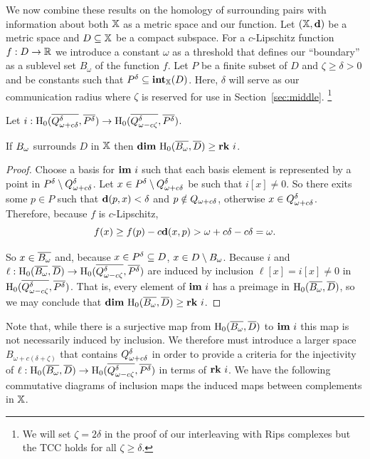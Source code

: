 We now combine these results on the homology of surrounding pairs with information about both $\mathbb{X}$ as a metric space and our function.
Let $(\mathbb{X},\mathbf{d})$ be a metric space and $D\subseteq \mathbb{X}$ be a compact subspace.
For a $c$-Lipschitz function $f : D\to \mathbb{R}$ we introduce a constant $\omega$ as a threshold that defines our ``boundary'' as a sublevel set $B_\omega$ of the function $f$.
Let $P$ be a finite subset of $D$ and $\zeta\geq\delta > 0 $ and be constants such that $P^\delta\subseteq \mathbf{int}_{\mathbb{X}}(D)$.
Here, $\delta$ will serve as our communication radius where $\zeta$ is reserved for use in Section~\ref{sec:middle}.
  \footnote{We will set $\zeta = 2\delta$ in the proof of our interleaving with Rips complexes but the TCC holds for all $\zeta\geq\delta$.}

\begin{lemma}\label{lem:psurj}
  Let $i : \mathrm{H}_0(\overline{Q_{\omega + c{\delta}}^{\delta}}, \overline{P^{\delta}})\to \mathrm{H}_0(\overline{Q_{\omega - c\zeta}^{\delta}}, \overline{P^\delta})$.

  If $B_{\omega}$ surrounds $D$ in $\mathbb{X}$ then $\mathbf{dim}~\mathrm{H}_0(\overline{B_{\omega}}, \overline{D})\geq \mathbf{rk}~i$.
\end{lemma}
\begin{proof}
  Choose a basis for $\mathbf{im}~i$ such that each basis element is represented by a point in $P^{\delta}\setminus Q_{\omega + c{\delta}}^{\delta}$.
  Let $x\in P^{\delta}\setminus Q_{\omega + c{\delta}}^{\delta}$ be such that $i[x] \neq 0$.
  So there exits some $p\in P$ such that $\mathbf{d}(p, x) < \delta$ and $p\notin Q_{\omega + c{\delta}}$, otherwise $x\in Q_{\omega + c{\delta}}^{\delta}$.
  Therefore, because $f$ is $c$-Lipschitz,
  \[ f(x)\geq f(p) - c\mathbf{d}(x, p) > \omega + c{\delta} - c{\delta} =\omega.\]

  So $x\in\overline{B_{\omega}}$ and, because $x\in P^{\delta}\subseteq D$, $x\in D\setminus B_{\omega}$.
  Because $i$ and $\ell : \mathrm{H}_0(\overline{B_{\omega}}, \overline{D})\to \mathrm{H}_0(\overline{Q_{\omega - c\zeta}^{\delta}}, \overline{P^{\delta}})$ are induced by inclusion $\ell[x] = i[x]\neq 0$ in $\mathrm{H}_0(\overline{Q_{\omega - c\zeta}^{\delta}}, \overline{P^{\delta}})$.
  That is, every element of $\mathbf{im}~i$ has a preimage in $\mathrm{H}_0(\overline{B_{\omega}}, \overline{D})$, so we may conclude that $\mathbf{dim}~\mathrm{H}_0(\overline{B_{\omega}}, \overline{D})\geq \mathbf{rk}~i$.
\end{proof}

Note that, while there is a surjective map from $\mathrm{H}_0(\overline{B_{\omega}}, \overline{D})$ to $\mathbf{im}~i$ this map is not necessarily induced by inclusion.
We therefore must introduce a larger space $B_{\omega+c(\delta+\zeta)}$ that contains $Q_{\omega + c{\delta}}^{\delta}$ in order to provide a criteria for the injectivity of $\ell : \mathrm{H}_0(\overline{B_{\omega}}, \overline{D})\to\mathrm{H}_0(\overline{Q_{\omega - c\zeta}^{\delta}}, \overline{P^{\delta}})$ in terms of $\mathbf{rk}~i$.
We have the following commutative diagrams of inclusion maps the induced maps between complements in $\mathbb{X}$.

